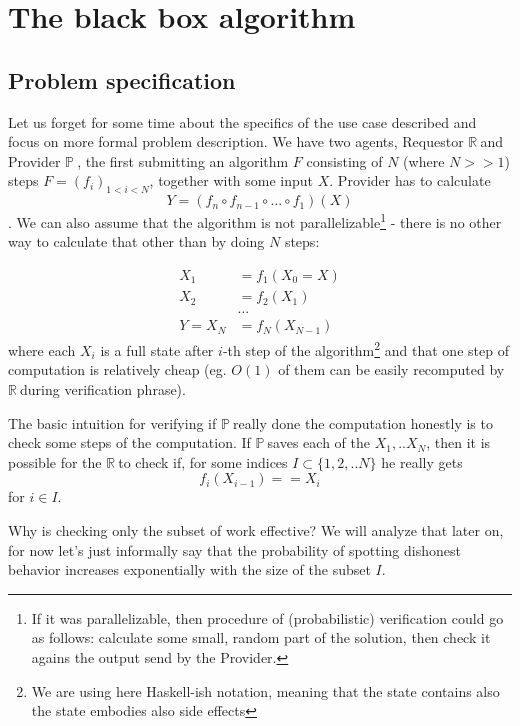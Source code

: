 \documentclass{winnower}
\newcommand{\R}{$\mathbb{R\ }$}
\newcommand{\X}{$\mathbb{P\ }$}
\begin{document}
\section{The black box algorithm}

\subsection{Problem specification}

Let us forget for some time about the specifics of the use case described and focus on more formal problem description. We have two agents, Requestor \R and Provider \X, the first submitting an algorithm $F$ consisting of $N$ (where $N >> 1$) steps $F = (f_i)_{1<i<N}$, together with some input $X$. Provider has to calculate $$Y = (f_n \circ f_{n-1} \circ ... \circ f_1)(X)$$. We can also assume that the algorithm is not parallelizable\footnote{If it was parallelizable, then procedure of (probabilistic) verification could go as follows: calculate some small, random part of the solution, then check it agains the output send by the Provider.} - there is no other way to calculate that other than by doing $N$ steps:

\begin{equation}
\begin{aligned}
X_1 &= f_1(X_0=X) \\
X_2 &= f_2(X_1) \\
&... \\
Y = X_N &= f_N(X_{N-1})
\end{aligned}
\end{equation}
where each $X_i$ is a full state after $i$-th step of the algorithm\footnote{We are using here Haskell-ish notation, meaning that the state contains also the state embodies also side effects} and that one step of computation is relatively cheap (eg. $O(1)$ of them can be easily recomputed by \R during verification phrase).

The basic intuition for verifying if \X really done the computation honestly is to check some steps of the computation. If \X saves each of the $X_1, .. X_N$, then it is possible for the \R to check if, for some indices $I \subset \{1, 2, .. N\}$ he really gets $$f_i(X_{i-1}) == X_i$$ for $i \in I$.

Why is checking only the subset of work effective? We will analyze that later on, for now let's just informally say that the probability of spotting dishonest behavior increases exponentially with the size of the subset $I$.
\end{document}
